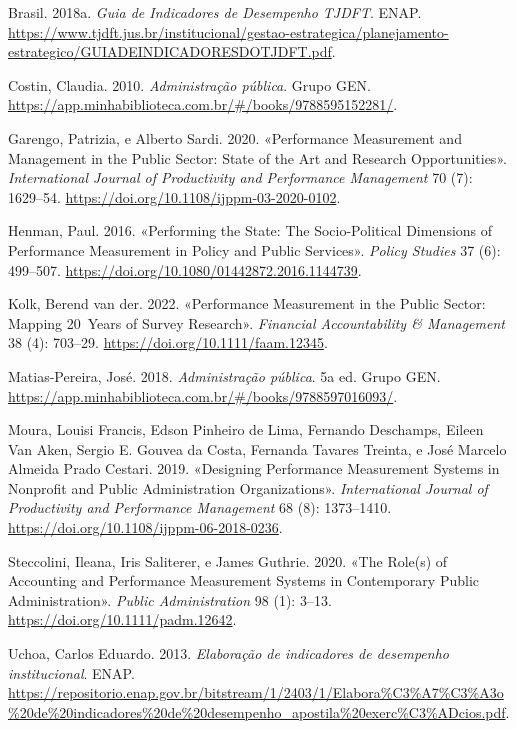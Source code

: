 \documentclass[
  letterpaper,
  DIV=11,
  numbers=noendperiod]{scrreprt}
\newlength{\cslhangindent}
\newlength{\cslentryspacingunit} %
\newenvironment{CSLReferences}[2] %
 {%
  \setlength{\parindent}{0pt}
  \ifodd #1
  \let\oldpar\par
  \def\par{\hangindent=\cslhangindent\oldpar}
  \fi
  \setlength{\parskip}{#2\cslentryspacingunit}
 }%
 {}
\begin{document}
\hypertarget{refs}{}
\begin{CSLReferences}{1}{0}
\leavevmode{}%
Brasil. 2018a. \emph{Guia de Indicadores de Desempenho TJDFT}. ENAP.
\url{https://www.tjdft.jus.br/institucional/gestao-estrategica/planejamento-estrategico/GUIADEINDICADORESDOTJDFT.pdf}.

\leavevmode{}%
Costin, Claudia. 2010. \emph{Administração pública}. Grupo GEN.
\url{https://app.minhabiblioteca.com.br/\#/books/9788595152281/}.

\leavevmode{}%
Garengo, Patrizia, e Alberto Sardi. 2020. {«Performance Measurement and
Management in the Public Sector: State of the Art and Research
Opportunities»}. \emph{International Journal of Productivity and
Performance Management} 70 (7): 1629--54.
\url{https://doi.org/10.1108/ijppm-03-2020-0102}.

\leavevmode{}%
Henman, Paul. 2016. {«Performing the State: The Socio-Political
Dimensions of Performance Measurement in Policy and Public Services»}.
\emph{Policy Studies} 37 (6): 499--507.
\url{https://doi.org/10.1080/01442872.2016.1144739}.

\leavevmode{}%
Kolk, Berend van der. 2022. {«Performance Measurement in the Public
Sector: Mapping 20~Years of Survey Research»}. \emph{Financial
Accountability \& Management} 38 (4): 703--29.
\url{https://doi.org/10.1111/faam.12345}.

\leavevmode{}%
Matias-Pereira, José. 2018. \emph{Administração pública}. 5a ed. Grupo
GEN. \url{https://app.minhabiblioteca.com.br/\#/books/9788597016093/}.

\leavevmode{}%
Moura, Louisi Francis, Edson Pinheiro de Lima, Fernando Deschamps,
Eileen Van Aken, Sergio E. Gouvea da Costa, Fernanda Tavares Treinta, e
José Marcelo Almeida Prado Cestari. 2019. {«Designing Performance
Measurement Systems in Nonprofit and Public Administration
Organizations»}. \emph{International Journal of Productivity and
Performance Management} 68 (8): 1373--1410.
\url{https://doi.org/10.1108/ijppm-06-2018-0236}.

\leavevmode{}%
Steccolini, Ileana, Iris Saliterer, e James Guthrie. 2020. {«The Role(s)
of Accounting and Performance Measurement Systems in Contemporary Public
Administration»}. \emph{Public Administration} 98 (1): 3--13.
\url{https://doi.org/10.1111/padm.12642}.

\leavevmode{}%
Uchoa, Carlos Eduardo. 2013. \emph{Elaboração de indicadores de
desempenho institucional}. ENAP.
\url{https://repositorio.enap.gov.br/bitstream/1/2403/1/Elabora\%C3\%A7\%C3\%A3o\%20de\%20indicadores\%20de\%20desempenho_apostila\%20exerc\%C3\%ADcios.pdf}.

\end{CSLReferences}
\end{document}
